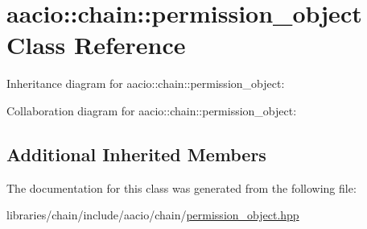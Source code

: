 \hypertarget{classaacio_1_1chain_1_1permission__object}{}\section{aacio\+:\+:chain\+:\+:permission\+\_\+object Class Reference}
\label{classaacio_1_1chain_1_1permission__object}


Inheritance diagram for aacio\+:\+:chain\+:\+:permission\+\_\+object\+:


Collaboration diagram for aacio\+:\+:chain\+:\+:permission\+\_\+object\+:
\subsection*{Additional Inherited Members}


The documentation for this class was generated from the following file\+:\begin{DoxyCompactItemize}
\item 
libraries/chain/include/aacio/chain/\mbox{\hyperlink{permission__object_8hpp}{permission\+\_\+object.\+hpp}}\end{DoxyCompactItemize}
